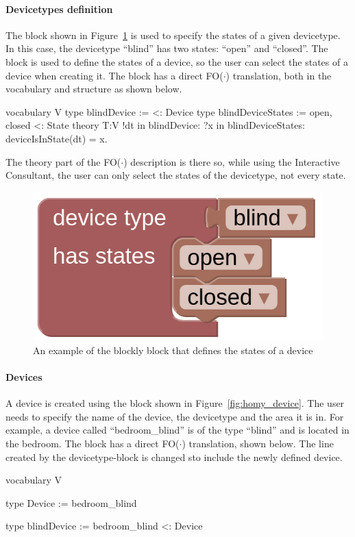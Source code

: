 \documentclass[11pt,a4paper]{report}
\newcommand{\fodot}{FO($\cdot$)\xspace}
\begin{document}
\paragraph{Devicetypes definition}
The block shown in Figure~\ref{fig:homy_device_type} is used to specify the states of a given devicetype. In this case, the devicetype ``blind'' has two states: ``open'' and ``closed''. The block is used to define the states of a device, so the user can select the states of a device when creating it. The block has a direct \fodot translation, both in the vocabulary and structure as shown below.
\begin{idplisting}
vocabulary V {
    type blindDevice := {} <: Device
    type blindDeviceStates := {open, closed} <: State
}
theory T:V {
    !dt in blindDevice: ?x in blindDeviceStates: deviceIsInState(dt) = x.
}
\end{idplisting}

The theory part of the \fodot description is there so, while using the Interactive Consultant, the user can only select the states of the devicetype, not every state.

\begin{figure}
    \centering
    \includegraphics[width=0.4\linewidth]{images/homy_device_type.png}
    \caption{An example of the blockly block that defines the states of a device}
    \label{fig:homy_device_type}
\end{figure}

\paragraph{Devices}
A device is created using the block shown in Figure~\ref{fig:homy_device}. The user needs to specify the name of the device, the devicetype and the area it is in. For example, a device called ``bedroom_blind'' is of the type ``blind'' and is located in the bedroom. The block has a direct \fodot translation, shown below. The line created by the devicetype-block is changed sto include the newly defined device.

\begin{idplisting}
vocabulary V {
    type Device := {bedroom_blind} 

    type blindDevice := {bedroom_blind} <: Device
}
\end{idplisting}
\end{document}
